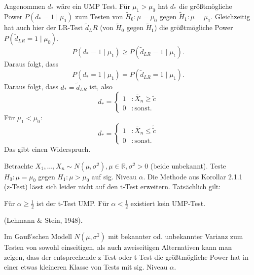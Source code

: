 \documentclass[10pt]{article}
\newcommand{\FZV}{X_1, \ldots, X_n} %
\newcommand{\IR}{\mathbb{R}} %
\newenvironment{BSP}[1][]
{\begin{Beispiel}[frametitle=#1]}{\end{Beispiel}}
\newenvironment{BWS}[1][]
{\begin{Beweis}[frametitle=#1]}{\end{Beweis}}
\begin{document}
			\begin{BWS}[Beweis 2.1.3 (Kein UMP-Test bei Normalverteilung)]
				Angenommen $d_{*}$ wäre ein UMP Test. Für $\mu_1 > \mu_0$ hat $d_{*}$ die größtmögliche Power $P(d_{*} = 1 \mid \mu_1)$ zum Testen von $\tilde{H}_0: \mu = \mu_0$ gegen $\tilde{H}_1: \mu = \mu_1$. Gleichzeitig hat auch hier der LR-Test $\tilde{d}_LR$ (von $\tilde{H}_0$ gegen $\tilde{H}_1$) die größtmögliche Power $P(\tilde{d}_{LR} = 1 \mid \mu_0)$.
				\begin{equation*}
					P(d_{*} = 1 \mid \mu_1) \geq P(\tilde{d}_{LR} = 1 \mid \mu_1).
				\end{equation*}
				Daraus folgt, dass
				\begin{equation*}
					P(d_{*} = 1 \mid \mu_1) = P(\tilde{d}_{LR} = 1 \mid \mu_1). 
				\end{equation*}
				Daraus folgt, dass $d_{*} = \tilde{d}_{LR}$ ist, also 
				\begin{equation*}
					d_{*} = \begin{cases}
						1 &: \bar{X}_n \geq \tilde{c}\\
						0 &: \text{sonst}. 
					\end{cases}
				\end{equation*}
				Für $\mu_1 < \mu_0$:
					\begin{equation*}
					d_{*} = \begin{cases}
						1 &: \bar{X}_n \leq \tilde{\tilde{c}}\\
						0 &: \text{sonst}. 
					\end{cases}
				\end{equation*}
				Das gibt einen Widerspruch. 
			\end{BWS}
			\begin{BSP}[Beispiel 2.1.5 (Lehmann und Stein)]
				Betrachte $\FZV \sim N(\mu, \sigma^2), \mu \in \IR, \sigma^2 >0$ (beide unbekannt). Teste $H_0: \mu = \mu_0$ gegen $H_1: \mu > \mu_0$ auf sig. Niveau $\alpha$. Die Methode aus Korollar 2.1.1 (z-Test) lässt sich leider nicht auf den t-Test erweitern. Tatsächlich gilt:
				
				Für $\alpha \geq \frac{1}{2}$ ist der t-Test UMP. 
				Für $\alpha < \frac{1}{2}$ existiert kein UMP-Test.
				
				(Lehmann $\&$ Stein, 1948). 
			\end{BSP}
			
			\begin{Bemerkung}
				Im Gauß'schen Modell $N(\mu, \sigma^2)$ mit bekannter od. unbekannter Varianz zum Testen von sowohl einseitigen, als auch zweiseitigen Alternativen kann man zeigen, dass der entsprechende z-Test oder t-Test die größtmögliche Power hat in einer etwas kleineren Klasse von Tests mit sig. Niveau $\alpha$. 
			\end{Bemerkung}
			
\end{document}
